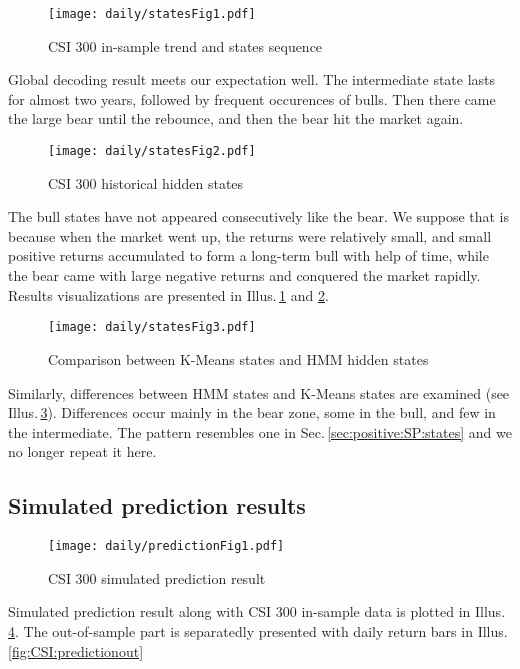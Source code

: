         \begin{figure}[!hbt]
        \center
        \texttt{[image: daily/statesFig1.pdf]}
        \caption{CSI 300 in-sample trend and states sequence}
        \label{fig:CSI:seqstates}
        \end{figure}
Global decoding result meets our expectation well.
The intermediate state lasts for almost two years,
followed by frequent occurences of bulls.
Then there came the large bear until the rebounce,
and then the bear hit the market again.

        \begin{figure}[!hbt]
        \center
        \texttt{[image: daily/statesFig2.pdf]}
        \caption{CSI 300 historical hidden states}
        \label{fig:CSI:states}
        \end{figure}
The bull states have not appeared consecutively like the bear.
We suppose that is because when the market went up,
the returns were relatively small, 
and small positive returns accumulated to form a long-term bull with help of time,
while the bear came with large negative returns and conquered the market rapidly.
Results visualizations are presented in 
Illus.\,\ref{fig:CSI:seqstates} and \ref{fig:CSI:states}.

        \begin{figure}[!hbt]
        \center
        \texttt{[image: daily/statesFig3.pdf]}
        \caption{Comparison between K-Means states and HMM hidden states}
        \label{fig:CSI:diffstates}
        \end{figure}
Similarly, differences between HMM states and K-Means states are examined 
(see Illus.\,\ref{fig:CSI:diffstates}).
Differences occur mainly in the bear zone, some in the bull, and few in the intermediate.
The pattern resembles one in Sec.\,\ref{sec:positive:SP:states} and 
we no longer repeat it here.


\subsection{Simulated prediction results}
\label{sec:positive:CSI:prediction}

        \begin{figure}[!hbt]
        \center
        \texttt{[image: daily/predictionFig1.pdf]}
        \caption{CSI 300 simulated prediction result}
        \label{fig:CSI:predictionall}
        \end{figure}
Simulated prediction result along with CSI 300 in-sample data
is plotted in Illus.\,\ref{fig:CSI:predictionall}.
The out-of-sample part is separatedly presented with daily return bars
in Illus.\,\ref{fig:CSI:predictionout}

